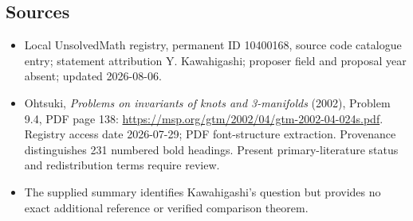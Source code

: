 \documentclass[11pt]{article}
\begin{document}
\subsection{Sources}
\begin{itemize}
\item Local UnsolvedMath registry, permanent ID 10400168, source code catalogue entry; statement attribution Y. Kawahigashi; proposer field and proposal year absent; updated 2026-08-06.
\item Ohtsuki, \emph{Problems on invariants of knots and 3-manifolds} (2002), Problem 9.4, PDF page 138: \url{https://msp.org/gtm/2002/04/gtm-2002-04-024s.pdf}. Registry access date 2026-07-29; PDF font-structure extraction. Provenance distinguishes 231 numbered bold headings. Present primary-literature status and redistribution terms require review.
\item The supplied summary identifies Kawahigashi's question but provides no exact additional reference or verified comparison theorem.
\end{itemize}
\end{document}

